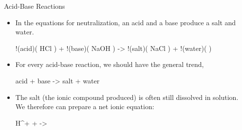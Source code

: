\documentclass[notes=hide]{beamer}
\begin{document}
%
%
%	

\begin{frame}{Acid-Base Reactions}
	\begin{itemize}
		\item In the equations for neutralization, an acid and a base
			produce a salt and water.
			\begin{reaction*}
				!(acid)( HCl\aq{} ) + !(base)( NaOH\aq{} ) ->
				!(salt)( NaCl\aq{} ) + !(water)( \water\lqd{} )
			\end{reaction*}

		\item For \alert{every} acid-base reaction, we should have the
			general trend,
			\begin{reaction*}
				acid + base -> salt + water
			\end{reaction*}

		\item The \alert{salt} (the ionic compound produced) is often
			still dissolved in solution. We therefore can prepare a
			\alert{net ionic equation}:
			\begin{reaction*}
				H^{+}\aq{} + \Hyd\aq{} -> \water\lqd{}
			\end{reaction*}
	\end{itemize}
\end{frame}
\end{document}
